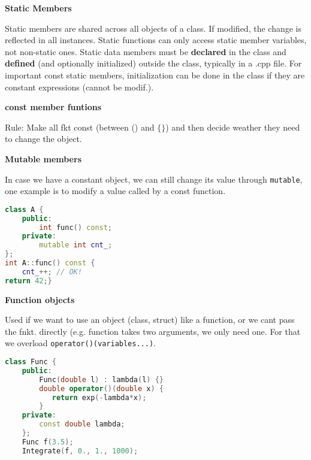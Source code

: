 \documentclass[fontsize=8pt, a4paper, landscape, fleqn]{scrartcl}
\renewcommand{\subsection}[1]{%
    \noindent\colorbox{subsectioncolor}{%
        \parbox{\dimexpr\columnwidth-2\fboxsep}{\color{white}\textbf{#1}}}%
    \vspace{0.5mm}%
}
\begin{document}
\begin{multicols*}{3}[\raggedcolumns]
    \subsection{Static Members}
Static members are shared across all objects of a class. If modified, the change is reflected in all instances. Static functions can only access static member variables, not non-static ones. Static data members must be \textbf{declared} in the class and \textbf{defined} (and optionally initialized) outside the class, typically in a .cpp file. For important const static members, initialization can be done in the class if they are constant expressions (cannot be modif.).
    \subsection{const member funtions}
    Rule: Make all fkt const (between () and $\{\}$) and then decide weather they need to change the object. 
    \subsection{Mutable members}
    In case we have a constant object, we can still change its value through \lstinline{mutable}, one example is to modify a value called by a const function.

    \begin{lstlisting}[language=C++, breaklines, emph={mutable}, emphstyle={\color{red}}]   
class A {
    public:
        int func() const;
    private:
        mutable int cnt_;
};
int A::func() const {
    cnt_++; // OK!
return 42;} \end{lstlisting}

    \subsection{Function objects} 
     Used if we want to use an object (class, struct) like a function, or we cant pass the fnkt. directly (e.g. function takes two arguments, we only need one. For that we overload 
     \lstinline{operator()(variables...)}. 

    \begin{lstlisting}[language=C++, breaklines, emph={operator}, emphstyle={\color{red}}]   
class Func {
    public:
        Func(double l) : lambda(l) {}
        double operator()(double x) {
           return exp(-lambda*x);
        }
    private:
        const double lambda;
    };
    Func f(3.5);
    Integrate(f, 0., 1., 1000); \end{lstlisting}

\end{multicols*}
\end{document}
